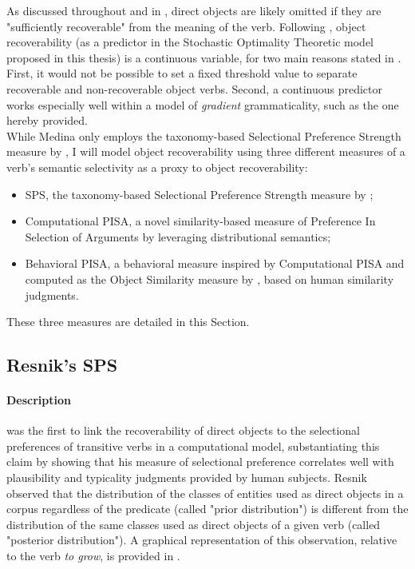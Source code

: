 As discussed throughout  and in , direct objects are likely omitted if they are "sufficiently recoverable" \parencite{Glass2013} from the meaning of the verb. Following \textcite{Medina2007}, object recoverability (as a predictor in the Stochastic Optimality Theoretic model proposed in this thesis) is a continuous variable, for two main reasons stated in . First, it would not be possible to set a fixed threshold value to separate recoverable and non-recoverable object verbs. Second, a continuous predictor works especially well within a model of \textit{gradient} grammaticality, such as the one hereby provided.\\
While Medina only employs the taxonomy-based Selectional Preference Strength measure by \textcite{Resnik1993, Resnik1996}, I will model object recoverability using three different measures of a verb's semantic selectivity as a proxy to object recoverability:

\begin{itemize}
    \item SPS, the taxonomy-based Selectional Preference Strength measure by \textcite{Resnik1993, Resnik1996};
    \item Computational PISA, a novel similarity-based measure of Preference In Selection of Arguments by \textcite{CappelliLenciPISA} leveraging distributional semantics;
    \item Behavioral PISA, a behavioral measure inspired by Computational PISA and computed as the Object Similarity measure by \textcite{Medina2007}, based on human similarity judgments.
\end{itemize}

These three measures are detailed in this Section.


\subsection{Resnik's SPS} 

\paragraph{Description} \textcite{Resnik1993, Resnik1996} was the first to link the recoverability of direct objects to the selectional preferences of transitive verbs in a computational model, substantiating this claim by showing that his measure of selectional preference correlates well with plausibility and typicality judgments provided by human subjects. Resnik observed that the distribution of the classes of entities used as direct objects in a corpus regardless of the predicate (called "prior distribution") is different from the distribution of the same classes used as direct objects of a given verb (called "posterior distribution"). A graphical representation of this observation, relative to the verb \textit{to grow}, is provided in .

